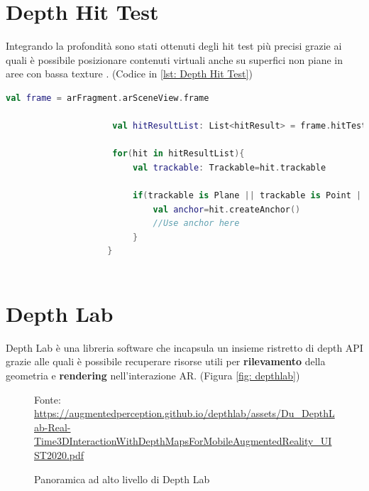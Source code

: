 \documentclass[crop=false, class=book]{standalone}
\begin{document}
		\section{Depth Hit Test}
		
		Integrando la profondità sono stati ottenuti degli hit test più precisi grazie ai quali è possibile posizionare contenuti virtuali anche su superfici non piane in aree con bassa texture \cite{google2022depth}. (Codice in \vref{lst: Depth Hit Test})\\

		\begin{center}
				\begin{minipage}{0.95\textwidth}
					\begin{lstlisting}[caption={Depth Hit Test}, label={lst: Depth Hit Test}, language=Kotlin]
					 val frame = arFragment.arSceneView.frame
					
					 val hitResultList: List<hitResult> = frame.hitTest(tap)
					
					 for(hit in hitResultList){
						 val trackable: Trackable=hit.trackable
						
						 if(trackable is Plane || trackable is Point || trackable is DepthPoint){
							 val anchor=hit.createAnchor()
							 //Use anchor here
						 }
					}
					
				\end{lstlisting}
			\end{minipage}
		\end{center}
		
		
		\section{Depth Lab}
		
		Depth Lab è una libreria software che incapsula un insieme ristretto di depth API grazie alle quali è possibile recuperare risorse utili per \textbf{rilevamento } della geometria e \textbf{rendering} nell'interazione AR. (Figura 			\vref{fig: depthlab})
		
		\begin{figure}
				\centering
		{Fonte: \url{https://augmentedperception.github.io/depthlab/assets/Du_DepthLab-Real-Time3DInteractionWithDepthMapsForMobileAugmentedReality_UIST2020.pdf}}
				\caption{Panoramica ad alto livello di Depth Lab}
				\label{fig: depthlab}
		\end{figure}
		
\end{document}
